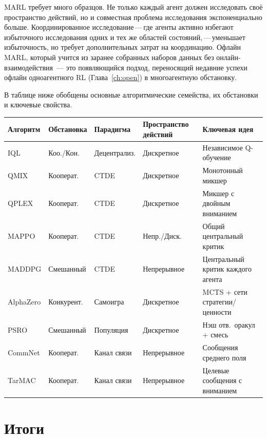 MARL требует много образцов. Не только каждый агент должен исследовать своё
пространство действий, но и совместная проблема исследования экспоненциально
больше. Координированное исследование\,---\,где агенты активно
избегают избыточного исследования одних и тех же областей состояний,\,---\,уменьшает
избыточность, но требует дополнительных затрат на координацию. Офлайн
MARL, который учится из заранее собранных наборов данных
без онлайн-взаимодействия~--- это появляющийся подход, переносящий
недавние успехи офлайн одноагентного RL
(Глава~\ref{ch:open}) в многоагентную обстановку.

В таблице ниже обобщены основные алгоритмические семейства,
их обстановки и ключевые свойства.

\begin{center}
\footnotesize
\begin{tabular}{@{}p{1.5cm}p{2cm}p{2.1cm}p{2.1cm}p{3.9cm}@{}}
\toprule
\textbf{Алгоритм} & \textbf{Обстановка} & \textbf{Парадигма} & \textbf{Пространство действий} & \textbf{Ключевая идея} \\
\midrule
IQL & Коо./Кон. & Децентрализ. & Дискретное & Независимое Q-обучение \\
QMIX & Кооперат. & CTDE & Дискретное & Монотонный микшер \\
QPLEX & Кооперат. & CTDE & Дискретное & Микшер с двойным вниманием \\
MAPPO & Кооперат. & CTDE & Непр./Диск. & Общий центральный критик \\
MADDPG & Смешанный & CTDE & Непрерывное & Центральный критик каждого агента \\
AlphaZero & Конкурент. & Самоигра & Дискретное & MCTS + сети стратегии/ценности \\
PSRO & Смешанный & Популяция & Дискретное & Нэш отв.\ оракул + смесь \\
CommNet & Кооперат. & Канал связи & Непрерывное & Сообщения среднего поля \\
TarMAC & Кооперат. & Канал связи & Непрерывное & Целевые сообщения с вниманием \\
\bottomrule
\end{tabular}
\end{center}

\section{Итоги}
\label{sec:marl-summary}

